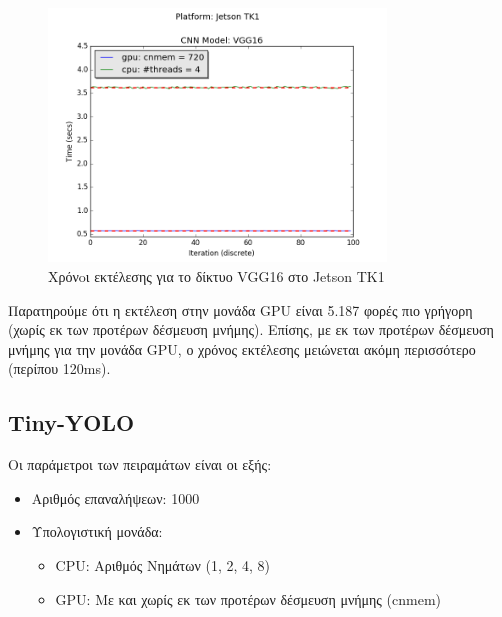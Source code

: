\begin{figure}[H]
  \centering
  \includegraphics[width=0.8\textwidth]{./images/chapter6/benchmark_vgg16_jetson.png}
  \caption[Χρόνoι εκτέλεσης για το δίκτυο VGG16 στο Jetson TK1]{Χρόνoι εκτέλεσης για το δίκτυο VGG16 στο Jetson TK1}
  \label{fig:vgg16_results_jetson}
\end{figure}

Παρατηρούμε ότι η εκτέλεση στην μονάδα GPU είναι 5.187 φορές πιο
γρήγορη (χωρίς εκ των προτέρων δέσμευση μνήμης).
Επίσης, με εκ των προτέρων δέσμευση μνήμης για την μονάδα GPU, ο χρόνος εκτέλεσης μειώνεται ακόμη
περισσότερο (περίπου 120ms).




\subsection{Tiny-YOLO}

Οι παράμετροι των πειραμάτων είναι οι εξής:
\begin{itemize}
  \item{Αριθμός επαναλήψεων: 1000}
  \item{Υπολογιστική μονάδα:}
    \begin{itemize}
      \item{CPU: Αριθμός Νημάτων (1, 2, 4, 8)}
      \item{GPU: Με και χωρίς εκ των προτέρων δέσμευση μνήμης (cnmem)}
    \end{itemize}
\end{itemize}

